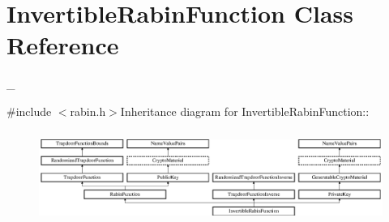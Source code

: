 \hypertarget{class_invertible_rabin_function}{
\section{InvertibleRabinFunction Class Reference}
\label{class_invertible_rabin_function}
}


\_\-  


{\ttfamily \#include $<$rabin.h$>$}Inheritance diagram for InvertibleRabinFunction::\begin{figure}[H]
\begin{center}
\leavevmode
\includegraphics[height=3.0303cm]{class_invertible_rabin_function}
\end{center}
\end{figure}
